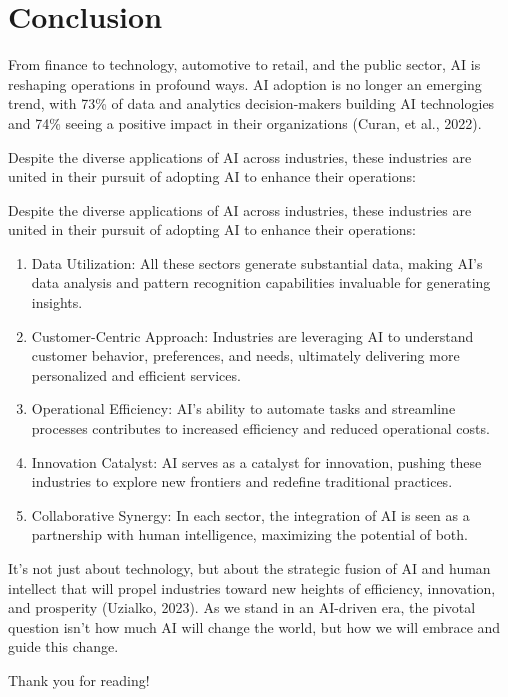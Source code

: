 \documentclass[
]{article}
\providecommand{\tightlist}{%
  \setlength{\itemsep}{0pt}\setlength{\parskip}{0pt}}
\begin{document}
\hypertarget{conclusion}{%
\section{Conclusion}\label{conclusion}}

From finance to technology, automotive to retail, and the public sector, AI is reshaping operations in profound ways. AI adoption is no longer an emerging trend, with 73\% of data and analytics decision-makers building AI technologies and 74\% seeing a positive impact in their organizations (Curan, et al., 2022).

Despite the diverse applications of AI across industries, these industries are united in their pursuit of adopting AI to enhance their operations:

Despite the diverse applications of AI across industries, these industries are united in their pursuit of adopting AI to enhance their operations:

\begin{enumerate}
\def\labelenumi{\arabic{enumi}.}
\tightlist
\item
  Data Utilization: All these sectors generate substantial data, making AI's data analysis and pattern recognition capabilities invaluable for generating insights.
\item
  Customer-Centric Approach: Industries are leveraging AI to understand customer behavior, preferences, and needs, ultimately delivering more personalized and efficient services.
\item
  Operational Efficiency: AI's ability to automate tasks and streamline processes contributes to increased efficiency and reduced operational costs.
\item
  Innovation Catalyst: AI serves as a catalyst for innovation, pushing these industries to explore new frontiers and redefine traditional practices.
\item
  Collaborative Synergy: In each sector, the integration of AI is seen as a partnership with human intelligence, maximizing the potential of both.
\end{enumerate}

It's not just about technology, but about the strategic fusion of AI and human intellect that will propel industries toward new heights of efficiency, innovation, and prosperity (Uzialko, 2023). As we stand in an AI-driven era, the pivotal question isn't how much AI will change the world, but how we will embrace and guide this change.

Thank you for reading!
\end{document}
